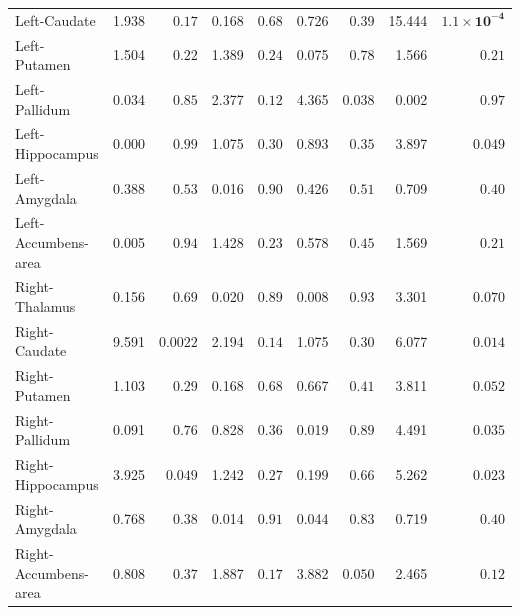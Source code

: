 \begin{tabular}{lrrrrrrrr}
Left-Caudate & 1.938 & $0.17$ & 0.168 & $0.68$ & 0.726 & $0.39$ & 15.444 & $\mathbf{1.1{\times}10^{-4}}$ \\
Left-Putamen & 1.504 & $0.22$ & 1.389 & $0.24$ & 0.075 & $0.78$ & 1.566 & $0.21$ \\
Left-Pallidum & 0.034 & $0.85$ & 2.377 & $0.12$ & 4.365 & $0.038$ & 0.002 & $0.97$ \\
Left-Hippocampus & 0.000 & $0.99$ & 1.075 & $0.30$ & 0.893 & $0.35$ & 3.897 & $0.049$ \\
Left-Amygdala & 0.388 & $0.53$ & 0.016 & $0.90$ & 0.426 & $0.51$ & 0.709 & $0.40$ \\
Left-Accumbens-area & 0.005 & $0.94$ & 1.428 & $0.23$ & 0.578 & $0.45$ & 1.569 & $0.21$ \\
Right-Thalamus & 0.156 & $0.69$ & 0.020 & $0.89$ & 0.008 & $0.93$ & 3.301 & $0.070$ \\
Right-Caudate & 9.591 & $\mathbf{0.0022}$ & 2.194 & $0.14$ & 1.075 & $0.30$ & 6.077 & $0.014$ \\
Right-Putamen & 1.103 & $0.29$ & 0.168 & $0.68$ & 0.667 & $0.41$ & 3.811 & $0.052$ \\
Right-Pallidum & 0.091 & $0.76$ & 0.828 & $0.36$ & 0.019 & $0.89$ & 4.491 & $0.035$ \\
Right-Hippocampus & 3.925 & $0.049$ & 1.242 & $0.27$ & 0.199 & $0.66$ & 5.262 & $0.023$ \\
Right-Amygdala & 0.768 & $0.38$ & 0.014 & $0.91$ & 0.044 & $0.83$ & 0.719 & $0.40$ \\
Right-Accumbens-area & 0.808 & $0.37$ & 1.887 & $0.17$ & 3.882 & $0.050$ & 2.465 & $0.12$ \\
\bottomrule
\end{tabular}

